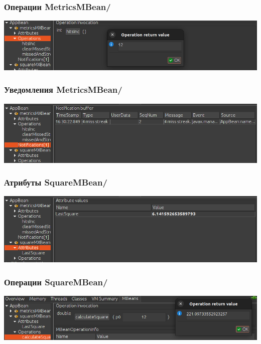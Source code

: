 \subsubsection{Операции MetricsMBean/}
\includegraphics[scale=0.5]{img/Ex2pics/MetricOperations}

\subsubsection{Уведомления MetricsMBean/}
\includegraphics[scale=0.5]{img/Ex2pics/MetricNotif}

\newpage

\thispagestyle{empty}

\BgThispage

\subsubsection{Атрибуты SquareMBean/}
\includegraphics[scale=0.5]{img/Ex2pics/SquareAttributes}

\subsubsection{Операции SquareMBean/}
\includegraphics[scale=0.5]{img/Ex2pics/SquareOperations}

